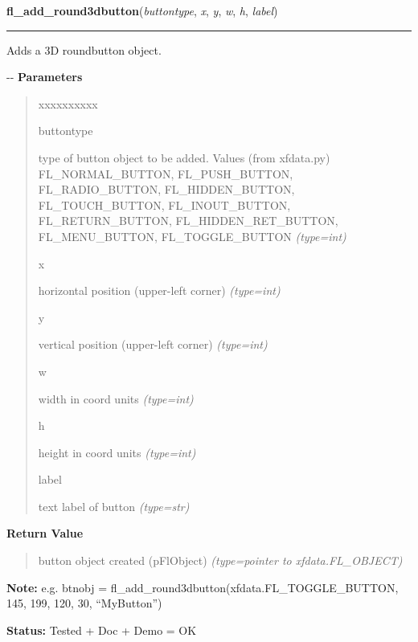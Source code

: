 \hspace{.8\funcindent}\begin{boxedminipage}{\funcwidth}

    \raggedright \textbf{fl\_add\_round3dbutton}(\textit{buttontype}, \textit{x}, \textit{y}, \textit{w}, \textit{h}, \textit{label})

    \vspace{-1.5ex}

    \rule{\textwidth}{0.5\fboxrule}
\setlength{\parskip}{2ex}

Adds a 3D roundbutton object.

-{}-
\setlength{\parskip}{1ex}
      \textbf{Parameters}
      \vspace{-1ex}

      \begin{quote}
        \begin{Ventry}{xxxxxxxxxx}

          \item[buttontype]


type of button object to be added. Values (from xfdata.py)
FL\_NORMAL\_BUTTON, FL\_PUSH\_BUTTON, FL\_RADIO\_BUTTON, FL\_HIDDEN\_BUTTON,
FL\_TOUCH\_BUTTON, FL\_INOUT\_BUTTON, FL\_RETURN\_BUTTON,
FL\_HIDDEN\_RET\_BUTTON, FL\_MENU\_BUTTON, FL\_TOGGLE\_BUTTON
            {\it (type=int)}

          \item[x]


horizontal position (upper-left corner)
            {\it (type=int)}

          \item[y]


vertical position (upper-left corner)
            {\it (type=int)}

          \item[w]


width in coord units
            {\it (type=int)}

          \item[h]


height in coord units
            {\it (type=int)}

          \item[label]


text label of button
            {\it (type=str)}

        \end{Ventry}

      \end{quote}

      \textbf{Return Value}
    \vspace{-1ex}

      \begin{quote}

button object created (pFlObject)
      {\it (type=pointer to xfdata.FL\_OBJECT)}

      \end{quote}

\textbf{Note:} 
e.g. btnobj = fl\_add\_round3dbutton(xfdata.FL\_TOGGLE\_BUTTON, 145,
199, 120, 30, ``MyButton'')


\textbf{Status:} 
Tested + Doc + Demo = OK


    \end{boxedminipage}

